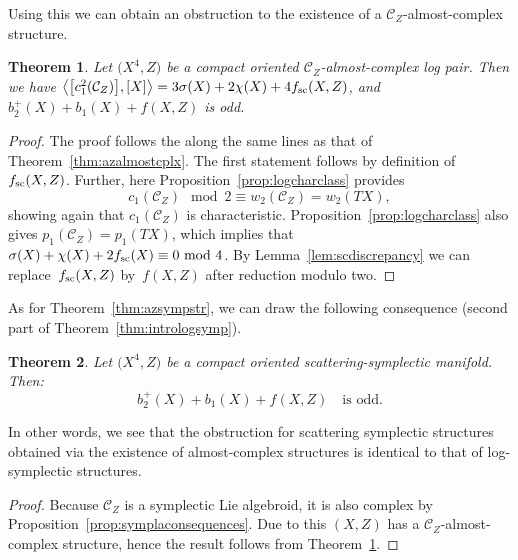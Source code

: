 \documentclass[pdftex]{sigma}
\numberwithin{equation}{section}
\newtheorem{Theorem}{Theorem}[section]
\begin{document}
Using this we can obtain an obstruction to the existence of a $\mathcal{C}_Z$-almost-complex structure.

\begin{Theorem}\label{thm:scatteringalmostcplx} Let $\big(X^4,Z\big)$ be a compact oriented $\mathcal{C}_Z$-almost-complex log pair. Then we have $\big\langle \big[c_1^2(\mathcal{C}_Z)\big], [X] \big\rangle = 3 \sigma(X) + 2 \chi(X) + 4 f_{\rm sc}(X,Z)$, and $b_2^+(X) + b_1(X) + f(X,Z)$ is odd.
\end{Theorem}

\begin{proof} The proof follows the along the same lines as that of Theorem~\ref{thm:azalmostcplx}. The first statement follows by definition of $f_{\rm sc}(X,Z)$. Further, here Proposition~\ref{prop:logcharclass} provides
\begin{displaymath}
	c_1(\mathcal{C}_Z) \!\!\mod 2 \equiv w_2(\mathcal{C}_Z) = w_2(TX),
\end{displaymath}
showing again that $c_1(\mathcal{C}_Z)$ is characteristic. Proposition~\ref{prop:logcharclass} also gives $p_1(\mathcal{C}_Z) = p_1(TX)$, which implies that $\sigma(X) + \chi(X) + 2 f_{\rm sc}(X) \equiv 0 \!\!\mod 4$. By Lemma~\ref{lem:scdiscrepancy} we can replace~$f_{\rm sc}(X,Z)$ by~$f(X,Z)$ after reduction modulo two.
\end{proof}

As for Theorem~\ref{thm:azsympstr}, we can draw the following consequence (second part of Theorem~\ref{thm:intrologsymp}).

\begin{Theorem}\label{thm:scatteringsymp} Let $\big(X^4,Z\big)$ be a compact oriented scattering-symplectic manifold. Then:
	\begin{displaymath}
		b_2^+(X) + b_1(X) + f(X,Z) \quad \text{is odd}.
	\end{displaymath}
\end{Theorem}

In other words, we see that the obstruction for scattering symplectic structures obtained via the existence of almost-complex structures is identical to that of log-symplectic structures.

\begin{proof} Because $\mathcal{C}_Z$ is a symplectic Lie algebroid, it is also complex by Proposition~\ref{prop:symplaconsequences}. Due to this $(X,Z)$ has a $\mathcal{C}_Z$-almost-complex structure, hence the result follows from Theorem~\ref{thm:scatteringalmostcplx}.
\end{proof}
\end{document}
